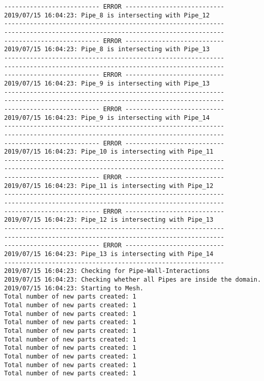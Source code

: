 \documentclass{article}
\begin{document}
{\begin{verbatim}
-------------------------- ERROR ---------------------------
2019/07/15 16:04:23: Pipe_8 is intersecting with Pipe_12
------------------------------------------------------------
------------------------------------------------------------
-------------------------- ERROR ---------------------------
2019/07/15 16:04:23: Pipe_8 is intersecting with Pipe_13
------------------------------------------------------------
------------------------------------------------------------
-------------------------- ERROR ---------------------------
2019/07/15 16:04:23: Pipe_9 is intersecting with Pipe_13
------------------------------------------------------------
------------------------------------------------------------
-------------------------- ERROR ---------------------------
2019/07/15 16:04:23: Pipe_9 is intersecting with Pipe_14
------------------------------------------------------------
------------------------------------------------------------
-------------------------- ERROR ---------------------------
2019/07/15 16:04:23: Pipe_10 is intersecting with Pipe_11
------------------------------------------------------------
------------------------------------------------------------
-------------------------- ERROR ---------------------------
2019/07/15 16:04:23: Pipe_11 is intersecting with Pipe_12
------------------------------------------------------------
------------------------------------------------------------
-------------------------- ERROR ---------------------------
2019/07/15 16:04:23: Pipe_12 is intersecting with Pipe_13
------------------------------------------------------------
------------------------------------------------------------
-------------------------- ERROR ---------------------------
2019/07/15 16:04:23: Pipe_13 is intersecting with Pipe_14
------------------------------------------------------------
2019/07/15 16:04:23: Checking for Pipe-Wall-Interactions
2019/07/15 16:04:23: Checking whether all Pipes are inside the domain.
2019/07/15 16:04:23: Starting to Mesh.
Total number of new parts created: 1
Total number of new parts created: 1
Total number of new parts created: 1
Total number of new parts created: 1
Total number of new parts created: 1
Total number of new parts created: 1
Total number of new parts created: 1
Total number of new parts created: 1
Total number of new parts created: 1
Total number of new parts created: 1
\end{verbatim}
}
\clearpage
\end{document}
